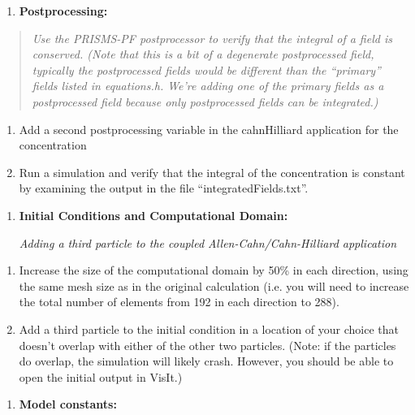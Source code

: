 \documentclass[]{article}
\begin{document}
\begin{enumerate}
\def\labelenumi{\arabic{enumi}.}
\item
  \textbf{Postprocessing:}
\end{enumerate}

\begin{quote}
\emph{Use the PRISMS-PF postprocessor to verify that the integral of a
field is conserved. (Note that this is a bit of a degenerate
postprocessed field, typically the postprocessed fields would be
different than the ``primary'' fields listed in equations.h. We're
adding one of the primary fields as a postprocessed field because only
postprocessed fields can be integrated.)}
\end{quote}

\begin{enumerate}
\def\labelenumi{\alph{enumi}.}
\item
  Add a second postprocessing variable in the cahnHilliard application
  for the concentration
\item
  Run a simulation and verify that the integral of the concentration is
  constant by examining the output in the file ``integratedFields.txt''.
\end{enumerate}

\begin{enumerate}
\def\labelenumi{\arabic{enumi}.}
\item
  \textbf{Initial Conditions and Computational Domain: }

  \emph{Adding a third particle to the coupled Allen-Cahn/Cahn-Hilliard
  application}
\end{enumerate}

\begin{enumerate}
\def\labelenumi{\alph{enumi}.}
\item
  Increase the size of the computational domain by 50\% in each
  direction, using the same mesh size as in the original calculation
  (i.e. you will need to increase the total number of elements from 192
  in each direction to 288).
\item
  Add a third particle to the initial condition in a location of your
  choice that doesn't overlap with either of the other two particles.
  (Note: if the particles do overlap, the simulation will likely crash.
  However, you should be able to open the initial output in VisIt.)
\end{enumerate}

\begin{enumerate}
\def\labelenumi{\arabic{enumi}.}
\item
  \textbf{Model constants:}
\end{enumerate}
\end{document}
